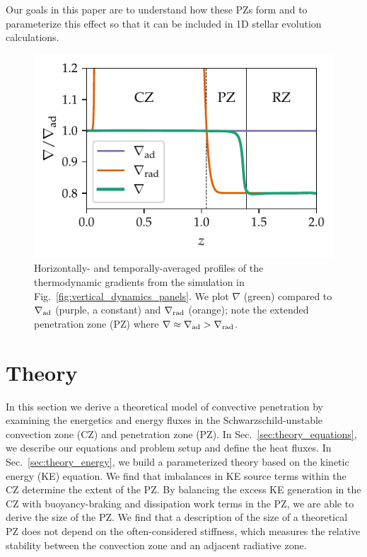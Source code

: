 \documentclass[twocolumn]{aastex631}
\newcommand{\gradrad}{\ensuremath{\nabla_{\rm{rad}}}}
\newcommand{\gradad}{\ensuremath{\nabla_{\rm{ad}}}}
\newcommand{\justgrad}{\ensuremath{\nabla}}
\begin{document}
Our goals in this paper are to understand how these PZs form and to parameterize this effect so that it can be included in 1D stellar evolution calculations.

\begin{figure}[t]
\centering
\includegraphics[width=\columnwidth]{grad_profiles.pdf}
\caption{
Horizontally- and temporally-averaged profiles of the thermodynamic gradients from the simulation in Fig.~\ref{fig:vertical_dynamics_panels}.
We plot $\justgrad$ (green) compared to $\gradad$ (purple, a constant) and $\gradrad$ (orange); note the extended penetration zone (PZ) where $\justgrad \approx \gradad > \gradrad$.
\label{fig:grad_profiles}
}
\end{figure}



\section{Theory}
\label{sec:theory}
In this section we derive a theoretical model of convective penetration by examining the energetics and energy fluxes in the Schwarzschild-unstable convection zone (CZ) and penetration zone (PZ).
In Sec.~\ref{sec:theory_equations}, we describe our equations and problem setup and define the heat fluxes.
In Sec.~\ref{sec:theory_energy}, we build a parameterized theory based on the kinetic energy (KE) equation.
We find that imbalances in KE source terms within the CZ determine the extent of the PZ.
By balancing the excess KE generation in the CZ with buoyancy-braking and dissipation work terms in the PZ, we are able to derive the size of the PZ.
We find that a description of the size of a theoretical PZ does not depend on the often-considered stiffness, which measures the relative stability between the convection zone and an adjacent radiative zone.
\end{document}

